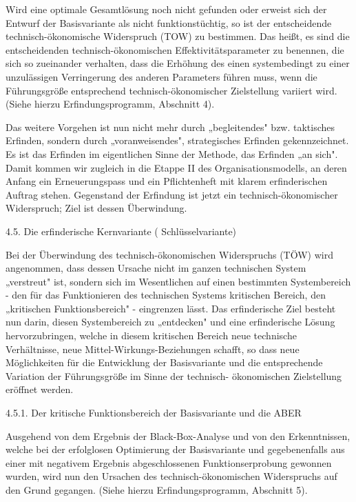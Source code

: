 \documentclass[12pt,a4paper]{article}
\begin{document}
Wird eine optimale Gesamtlösung noch nicht gefunden oder erweist sich der Entwurf der Basisvariante als nicht funktionstüchtig, so ist der entscheidende technisch-ökonomische Widerspruch (TOW) zu bestimmen. Das heißt, es sind die entscheidenden technisch-ökono­mischen Effektivitätsparameter zu benennen, die sich so zueinander verhalten, dass die Erhöhung des einen systembedingt zu einer unzulässigen Verringerung des anderen Parameters führen muss, wenn die Führungsgröße entsprechend technisch-ökonomischer Zielstellung va­riiert wird. (Siehe hierzu Erfindungsprogramm, Abschnitt 4).

Das weitere Vorgehen ist nun nicht mehr durch „begleitendes" bzw. taktisches Erfinden, sondern durch „voranweisendes", strategisches Erfinden gekennzeichnet. Es ist das Erfinden im eigentlichen Sinne der Methode, das Erfinden „an sich". Damit kommen wir zugleich in die Etappe II des Organisationsmodells, an deren Anfang ein Erneuerungspass und ein Pflichtenheft mit klarem erfinderischen Auftrag stehen. Gegenstand der Erfindung ist jetzt ein technisch-­ökonomischer Widerspruch; Ziel ist dessen Überwindung.


4.5.  Die erfinderische Kernvariante ( Schlüsselvariante)

Bei der Überwindung des technisch-ökonomischen Widerspruchs (TÖW) wird angenommen, dass dessen Ursache nicht im ganzen technischen System „verstreut" ist, sondern sich im Wesentlichen auf einen bestimmten Systembereich - den für das Funktionieren des technischen Systems kritischen Bereich, den „kritischen Funktionsbereich" - eingrenzen lässt. Das erfinderische Ziel besteht nun darin, diesen Systembereich zu „entdecken" und eine erfinderische Lösung hervorzubringen, welche in diesem kritischen Bereich neue technische Verhältnisse, neue Mittel-Wirkungs-Beziehungen schafft, so dass neue Möglichkeiten für die Entwicklung der Basisvariante und die entsprechende Variation der Führungsgröße im Sinne der technisch- ökonomischen Zielstellung eröffnet werden.

4.5.1.  Der kritische Funktionsbereich der Basisvariante und die ABER

Ausgehend von dem Ergebnis der Black-Box-Analyse und von den Erkenntnissen, welche bei der erfolglosen Optimierung der Basisvariante und gegebenenfalls aus einer mit negativem Ergebnis abge­schlossenen Funktionserprobung gewonnen wurden, wird nun den Ursachen des technisch-ökonomischen Widerspruchs auf den Grund ge­gangen. (Siehe hierzu Erfindungsprogramm, Abschnitt 5).
\end{document}

